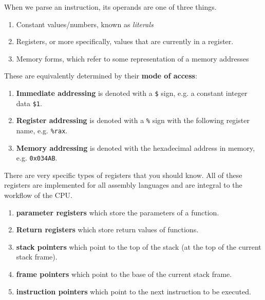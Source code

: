   \begin{definition}
    When we parse an instruction, its operands are one of three things. 
    \begin{enumerate}
      \item Constant values/numbers, known as \textit{literals}
      \item Registers, or more specifically, values that are currently in a register. 
      \item Memory forms, which refer to some representation of a memory addresses 
    \end{enumerate}

    These are equivalently determined by their \textbf{mode of access}:
    \begin{enumerate} 
      \item \textbf{Immediate addressing} is denoted with a \texttt{\$} sign, e.g. a constant integer data \texttt{\$1}. 
      \item \textbf{Register addressing} is denoted with a \texttt{\%} sign with the following register name, e.g. \texttt{\%rax}.
      \item \textbf{Memory addressing} is denoted with the hexadecimal address in memory, e.g. \texttt{0x034AB}.
    \end{enumerate}
  \end{definition}

  \begin{example}[Register]
    There are very specific types of registers that you should know. All of these registers are implemented for all assembly languages and are integral to the workflow of the CPU.  
    \begin{enumerate}
      \item \textbf{parameter registers} which store the parameters of a function.
      \item \textbf{Return registers} which store return values of functions. 
      \item \textbf{stack pointers} which point to the top of the stack (at the top of the current stack frame). 
      \item \textbf{frame pointers} which point to the base of the current stack frame.
      \item \textbf{instruction pointers} which point to the next instruction to be executed.
    \end{enumerate}
  \end{example}


